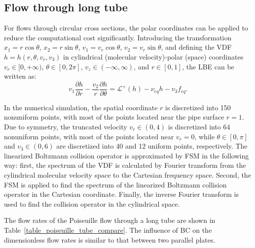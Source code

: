 \subsection{Flow through long tube}

For flows through circular cross sections, the  polar coordinates can be applied to reduce the computational cost significantly. Introducing the transformation $x_1=r\cos\theta$, $x_2=r\sin\theta$, $v_1=v_r\cos\theta$,  $v_2=v_r\sin\theta$, and defining the VDF $h=h(r,\theta,v_r,v_3)$ in cylindrical (molecular velocity)-polar (space) coordinates $v_r\in[0,+\infty)$, $\theta\in[0,2\pi]$, $v_z\in(-\infty,\infty)$, and $r\in[0,1]$, the LBE can be written as:
\begin{equation}\label{polar}
v_1\frac{\partial h}{\partial r}-\frac{v_2}{r}\frac{\partial h}{\partial \theta}=\mathcal{L}^+(h)-\nu_{eq}{h} -v_3f_{eq}. 
\end{equation}

In the numerical simulation, the spatial coordinate $r$ is discretized into 150 nonuniform points, with most of the points located near the pipe surface $r=1$. Due to symmetry, the truncated velocity $v_r\in(0,4)$ is discretized into 64 nonuniform points, with most of the points located near $v_r=0$, while $\theta\in[0,\pi]$ and $v_3\in(0,6)$ are discretized into 40 and 12 uniform points, respectively. The linearized Boltzmann collision operator is approximated by FSM in the following way: first, the spectrum of the VDF is calculated by Fourier transform from the cylindrical molecular velocity space to the Cartesian frequency space. Second, the FSM is applied to find the spectrum of the linearized Boltzmann collision operator in the Cartesian coordinate. Finally, the inverse Fourier transform is used to find the collision operator in the cylindrical space. 


The flow rates of the Poiseuille flow through a long tube are shown in Table~\ref{table_poiseuille_tube_compare}. The influence of BC on the dimensionless flow rates is similar to that between two parallel plates. 
